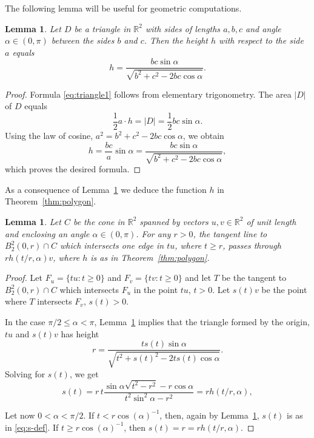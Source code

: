 \documentclass[a4paper,12pt]{article}
\newtheorem{lemma}[proposition]{Lemma}
\theoremstyle{definition}
\newcommand{\IR}{\mathbb{R}}
\begin{document}
The following lemma will be useful for geometric computations.
\begin{lemma}\label{lem:triangle}
Let $D$ be a triangle in $\mathbb R^{2}$ with sides of lengths $a,b,c$ and  angle $\alpha\in (0,\pi)$ between the sides $b$ and $c$. Then the height $h$ with respect to the side $a$ equals
\begin{equation}\label{eq:triangle1}
h=\frac{bc\sin\alpha}{\sqrt{b^2+c^2-2bc\cos\alpha}}.
\end{equation}
\end{lemma}

\begin{proof}
Formula \eqref{eq:triangle1} follows from elementary trigonometry.  The  area $|D|$ of $D$ equals
\[
\frac{1}{2}a\cdot h=
|D|=\frac{1}{2}bc\sin\alpha.
\]
Using the law of cosine, $ a^{2}=b^{2}+c^{2}-2bc\cos\alpha$, we obtain
\[
h=\frac{bc}{a}\sin\alpha=\frac{bc\sin\alpha}{\sqrt{b^{2}+c^{2}-2bc\cos\alpha}},
\]
which proves the desired formula.
\end{proof}

As a consequence of Lemma~\ref{lem:triangle} we deduce the function $h$ in Theorem~\ref{thm:polygon}. %

\begin{lemma} \label{lem:tangent}
Let $C$ be the cone in $\mathbb R^{2}$ spanned by vectors $u,v\in\IR^2$ of unit length and enclosing an angle $\alpha\in (0,\pi)$. For any $r>0$, the tangent line to $B_2^2(0,r)\cap C$ which intersects one edge in $tu$, where $t\ge r$, passes through $r h(t/r,\alpha)v$, where $h$ is as in Theorem~\ref{thm:polygon}.
\end{lemma}
\begin{proof}
	Let $F_u=\{tu\colon t\ge 0\}$ and $F_v=\{tv\colon t\ge 0\}$ and let $T$ be the tangent  to $B_2^2(0,r)\cap C$ which intersects $F_u$ in the point $tu$, $t>0$. Let $s(t)v$ be the point  where $T$ intersects $F_v$, $s(t)>0$.

	In the case $\pi/2\le \alpha<\pi$,  Lemma~\ref{lem:triangle} implies that the triangle formed by the origin, $tu$ and $s(t)v$ has height 
	\[
	r=\frac{ts(t)\sin\alpha}{\sqrt{t^2+s(t)^2-2ts(t)\cos\alpha}}.
	\]
	Solving  for $s(t)$, we get
	\begin{equation} \label{eq:s-def}
	s(t)=r\, t \frac{\sin\alpha \sqrt{t^2-r^2}-r\cos\alpha}{t^2\sin^2\alpha-r^2}
	=r h(t/r,\alpha),
	\end{equation}

	Let now $0<\alpha<\pi/2$. If $t < r\cos(\alpha)^{-1}$, then, again by Lemma~\ref{lem:triangle}, $s(t)$ is as in \eqref{eq:s-def}. If $t\ge r\cos(\alpha)^{-1}$, then $s(t)=r=rh(t/r,\alpha)$. 
\end{proof}
\end{document}
